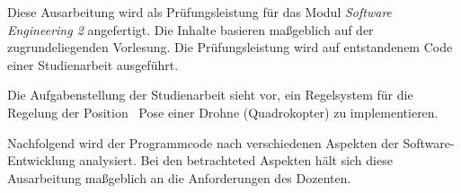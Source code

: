 
Diese Ausarbeitung wird als Prüfungsleistung für das Modul \textit{Software Engineering 2} angefertigt.
Die Inhalte basieren maßgeblich auf der zugrundeliegenden Vorlesung.
Die Prüfungsleistung wird auf entstandenem Code einer Studienarbeit ausgeführt.


Die Aufgabenstellung der Studienarbeit sieht vor, ein Regelsystem für die Regelung der Position \bzw\ Pose einer Drohne (Quadrokopter) zu implementieren.\\


Nachfolgend wird der Programmcode nach verschiedenen Aspekten der Software-Entwicklung analysiert. Bei den betrachteted Aspekten hält sich diese Ausarbeitung maßgeblich an die Anforderungen des Dozenten.